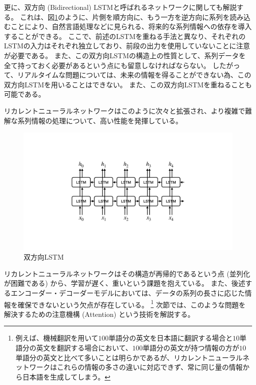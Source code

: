 更に、双方向 (Bidirectional) LSTMと呼ばれるネットワークに関しても解説する。
これは、図\ref{17BidirectionalLSTM}のように、片側を順方向に、もう一方を逆方向に系列を読み込むことにより、自然言語処理などに見られる、将来的な系列情報への依存を導入することができる。
ここで、前述のLSTMを重ねる手法と異なり、それぞれのLSTMの入力はそれぞれ独立しており、前段の出力を使用していないことに注意が必要である。
また、この双方向LSTMの構造上の性質として、系列データを全て持っておく必要があるという点にも留意しなければならない。
したがって、リアルタイムな問題については、未来の情報を得ることができない為、この双方向LSTMを用いることはできない。
また、この双方向LSTMを重ねることも可能である。

リカレントニューラルネットワークはこのように次々と拡張され、より複雑で難解な系列情報の処理について、高い性能を発揮している。

\begin{figure}[h]
 \centering
 \includegraphics[trim = 0 200 0 200, width=1.0\textwidth, clip]{Figure/2DeepLearning/17BidirectionalLSTM.png}
 \caption{双方向LSTM}
 \label{17BidirectionalLSTM}
\end{figure}

リカレントニューラルネットワークはその構造が再帰的であるという点 (並列化が困難である) から、学習が遅く、重いという課題を抱えている。
また、後述するエンコーダー・デコーダーモデルにおいては、データの系列の長さに応じた情報を確保できないという欠点が存在している。
\footnote{例えば、機械翻訳を用いて$100$単語分の英文を日本語に翻訳する場合と$10$単語分の英文を翻訳する場合において、$100$単語分の英文が持つ情報の方が$10$単語分の英文と比べて多いことは明らかであるが、リカレントニューラルネットワークはこれらの情報の多さの違いに対応できず、常に同じ量の情報から日本語を生成してしまう。}
次節では、このような問題を解決するための注意機構 (Attention) という技術を解説する。



